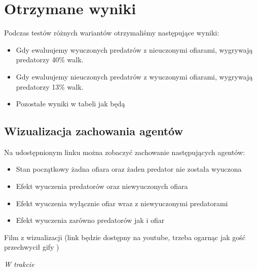 \section{Otrzymane wyniki}
Podczas testów różnych wariantów otrzymaliśmy następujące wyniki:
\begin{itemize}
    \item Gdy ewaluujemy wyuczonych predatrów z nieuczonymi ofiarami, wygrywają predatorzy 40\% walk.
    \item Gdy ewaluujemy nieuczonych predatrów z wyuczonymi ofiarami, wygrywają predatorzy 13\% walk.
    \item Pozostałe wyniki w tabeli jak będą 
\end{itemize}


\subsection{Wizualizacja zachowania agentów}

Na udostępnionym linku można zobaczyć zachowanie następujących agentów:
\begin{itemize}
    \item Stan początkowy żadna ofiara oraz żaden predator nie została wyuczona 
    \item Efekt wyuczenia predatorów oraz niewyuczonych ofiara
    \item Efekt wyuczenia wyłącznie ofiar wraz z niewyuczonymi predatorami
    \item Efekt wyuczenia zarówno predatorów jak i ofiar
\end{itemize}

Film z wizualizacji (link będzie dostępny na youtube, trzeba ogarnąc jak gość przechwycił gify )

\textit{W trakcie}
